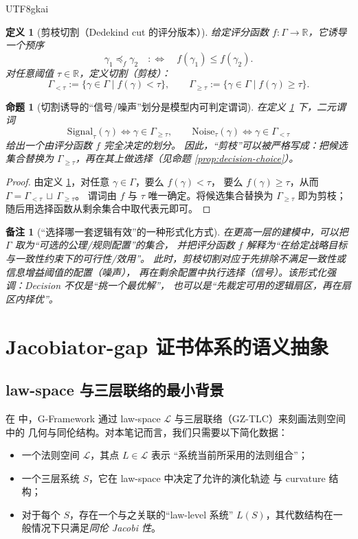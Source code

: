 \documentclass[12pt]{article}
\newtheorem{definition}{定义}[section]
\newtheorem{proposition}{命题}[section]
\newtheorem{remark}{备注}[section]
\begin{document}
\begin{CJK*}{UTF8}{gkai}
\begin{definition}[剪枝切割（Dedekind cut 的评分版本）]\label{def:dedekind-cut}
给定评分函数 $f:\Gamma\to\mathbb{R}$，它诱导一个预序
\[
  \gamma_1\preceq_f \gamma_2 \quad:\Longleftrightarrow\quad f(\gamma_1)\le f(\gamma_2).
\]
对任意阈值 $\tau\in\mathbb{R}$，定义切割（剪枝）：
\[
  \Gamma_{<\tau}:=\{\gamma\in\Gamma\mid f(\gamma)<\tau\},
\qquad
  \Gamma_{\ge\tau}:=\{\gamma\in\Gamma\mid f(\gamma)\ge\tau\}.
\]
\end{definition}

\begin{proposition}[切割诱导的“信号/噪声”划分是模型内可判定谓词]\label{prop:signal-noise-cut}
在定义 \ref{def:dedekind-cut} 下，二元谓词
\[
  \mathrm{Signal}_\tau(\gamma)\iff \gamma\in\Gamma_{\ge\tau},
\qquad
  \mathrm{Noise}_\tau(\gamma)\iff \gamma\in\Gamma_{<\tau}
\]
给出一个由评分函数 $f$ 完全决定的划分。
因此，“剪枝”可以被严格写成：把候选集合替换为 $\Gamma_{\ge\tau}$，再在其上做选择（见命题 \ref{prop:decision-choice}）。
\end{proposition}

\begin{proof}
由定义 \ref{def:dedekind-cut}，对任意 $\gamma\in\Gamma$，要么 $f(\gamma)<\tau$，
要么 $f(\gamma)\ge\tau$，从而 $\Gamma=\Gamma_{<\tau}\,\sqcup\,\Gamma_{\ge\tau}$。
谓词由 $f$ 与 $\tau$ 唯一确定。将候选集合替换为 $\Gamma_{\ge\tau}$ 即为剪枝；随后用选择函数从剩余集合中取代表元即可。
\end{proof}

\begin{remark}[“选择哪一套逻辑有效”的一种形式化方式]
在更高一层的建模中，可以把 $\Gamma$ 取为“可选的公理/规则配置”的集合，
并把评分函数 $f$ 解释为“在给定战略目标与一致性约束下的可行性/效用”。
此时，剪枝切割对应于先排除不满足一致性或信息增益阈值的配置（噪声），
再在剩余配置中执行选择（信号）。该形式化强调：Decision 不仅是“挑一个最优解”，
也可以是“先裁定可用的逻辑扇区，再在扇区内择优”。
\end{remark}

\section{Jacobiator-gap 证书体系的语义抽象}

\subsection{law-space 与三层联络的最小背景}

在 \cite{GaoZheng2025GFramework} 中，G-Framework
通过 law-space $\mathcal{L}$ 与三层联络（GZ-TLC）来刻画法则空间中的
几何与同伦结构。对本笔记而言，我们只需要以下简化数据：
\begin{itemize}
  \item 一个法则空间 $\mathcal{L}$，其点 $L\in\mathcal{L}$ 表示
        “系统当前所采用的法则组合”；
  \item 一个三层系统 $S$，它在 law-space 中决定了允许的演化轨迹
        与 curvature 结构；
  \item 对于每个 $S$，存在一个与之关联的“law-level 系统”
        $L(S)$，其代数结构在一般情况下只满足\emph{同伦 Jacobi 性}。
\end{itemize}


\end{CJK*}
\end{document}
